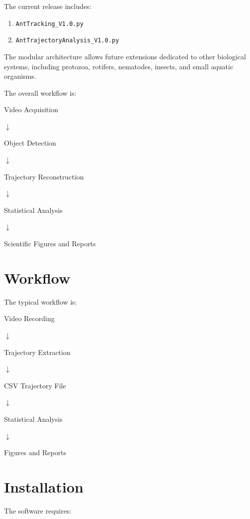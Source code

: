 \documentclass[11pt,a4paper]{article}
\begin{document}
The current release includes:

\begin{enumerate}
\item \texttt{AntTracking\_V1.0.py}
\item \texttt{AntTrajectoryAnalysis\_V1.0.py}
\end{enumerate}

The modular architecture allows future extensions dedicated to other biological systems, including protozoa, rotifers, nematodes, insects, and small aquatic organisms.

\vspace{0.5cm}

The overall workflow is:

\begin{center}
Video Acquisition

$\downarrow$

Object Detection

$\downarrow$

Trajectory Reconstruction

$\downarrow$

Statistical Analysis

$\downarrow$

Scientific Figures and Reports
\end{center}


\section{Workflow}

The typical workflow is:

\begin{center}
Video Recording

$\downarrow$

Trajectory Extraction

$\downarrow$

CSV Trajectory File

$\downarrow$

Statistical Analysis

$\downarrow$

Figures and Reports
\end{center}

\section{Installation}

The software requires:
\end{document}
